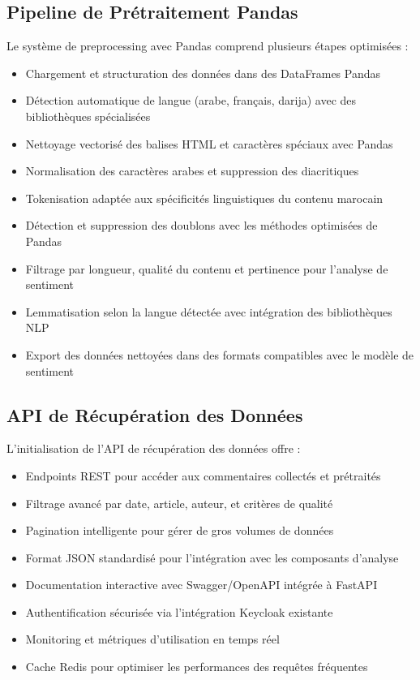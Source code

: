 \subsection{Pipeline de Prétraitement Pandas}

Le système de preprocessing avec Pandas comprend plusieurs étapes optimisées :
\begin{itemize}
    \item Chargement et structuration des données dans des DataFrames Pandas
    \item Détection automatique de langue (arabe, français, darija) avec des bibliothèques spécialisées
    \item Nettoyage vectorisé des balises HTML et caractères spéciaux avec Pandas
    \item Normalisation des caractères arabes et suppression des diacritiques
    \item Tokenisation adaptée aux spécificités linguistiques du contenu marocain
    \item Détection et suppression des doublons avec les méthodes optimisées de Pandas
    \item Filtrage par longueur, qualité du contenu et pertinence pour l'analyse de sentiment
    \item Lemmatisation selon la langue détectée avec intégration des bibliothèques NLP
    \item Export des données nettoyées dans des formats compatibles avec le modèle de sentiment
\end{itemize}

\subsection{API de Récupération des Données}

L'initialisation de l'API de récupération des données offre :
\begin{itemize}
    \item Endpoints REST pour accéder aux commentaires collectés et prétraités
    \item Filtrage avancé par date, article, auteur, et critères de qualité
    \item Pagination intelligente pour gérer de gros volumes de données
    \item Format JSON standardisé pour l'intégration avec les composants d'analyse
    \item Documentation interactive avec Swagger/OpenAPI intégrée à FastAPI
    \item Authentification sécurisée via l'intégration Keycloak existante
    \item Monitoring et métriques d'utilisation en temps réel
    \item Cache Redis pour optimiser les performances des requêtes fréquentes
\end{itemize}

